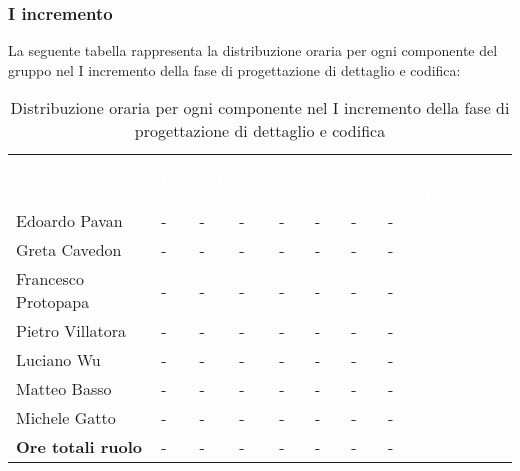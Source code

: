 \subsubsection{I incremento}
La seguente tabella rappresenta la distribuzione oraria per ogni componente del gruppo nel I incremento della fase di progettazione di dettaglio e codifica:
\begin{table}[!htbp]
\begin{center}
\renewcommand{\arraystretch}{1.25}
\begin{tabular}{ m{}<{\centering}  m{}<{\centering} m{}<{\centering} m{}<{\centering}  m{}<{\centering}  m{}<{\centering}  m{}<{\centering}  m{}<{\centering}   }
	\rowcolor{darkblue}
	\textcolor{white}{\textbf{Componente}} &\textcolor{white}{\textbf{Re}}&\textcolor{white}{\textbf{Ad}}&\textcolor{white}{\textbf{An}}&\textcolor{white}{\textbf{Pt}}&\textcolor{white}{\textbf{Pr}}&\textcolor{white}{\textbf{Ve}}&\textcolor{white}{\textbf{Ore complessive}}\\ 

	Edoardo Pavan & - & - & - & - & - & - & -\\	

	\rowcolor{gray!10} Greta Cavedon & - & - & - & - & - & - & -\\
	
	Francesco Protopapa & - & - & - & - & - & - & -\\
	
	\rowcolor{gray!10} Pietro Villatora & - & - & - & - & - & - & -\\
	
	Luciano Wu & - & - & - & - & - & - & -\\
	
	\rowcolor{gray!10} Matteo Basso & - & - & - & - & - & - & -\\
	
	Michele Gatto & - & - & - & - & - & - & -\\
	
	\rowcolor{gray!10} \textbf{Ore totali ruolo} & - & - & - & - & - & - & -\\

\end{tabular}
\caption{Distribuzione oraria per ogni componente nel I incremento della fase di progettazione di dettaglio e codifica}
\end{center}
\end{table}

